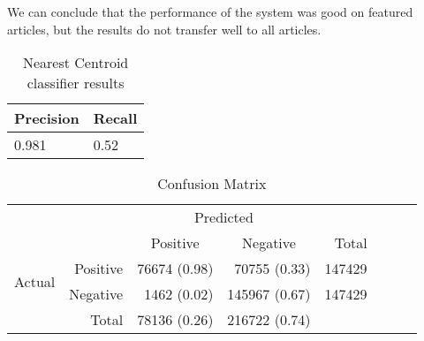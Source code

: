 We can conclude that the performance of the system was good on featured articles, but the results do not transfer well to all articles.

\begin{table}[htbp]
\centering
\begin{tabular}{@{}ll@{}}
\toprule
Precision     & Recall       \\ \midrule
\num{0.981} & \num{0.52} \\
\bottomrule
\end{tabular}
\caption[Nearest Centroid classifier results]{Nearest Centroid classifier results}\label{eval-results}
\end{table}

\begin{table}[htbp]
    \centering
     \begin{tabular}{rrrrrrrr}
      \toprule
      \multicolumn{2}{c}{} & \multicolumn{2}{c}{Predicted} & \\
      \cmidrule{3-4}
      \multicolumn{2}{c}{} & \multicolumn{1}{c}{Positive} & \multicolumn{1}{c}{Negative} & Total \\
      \midrule
      \multirow{2}{*}{Actual} & Positive & \num{76674} (\num{0.98}) & \num{70755} (0.33)  & \num{147429} \\
                              & Negative & \num{1462} (0.02)  & \num{145967} (0.67) & \num{147429} \\
                              \cmidrule{1-2}
                              & Total    & \num{78136} (0.26) & \num{216722} (0.74) \\
      \bottomrule
    \end{tabular}
    \caption[Confusion Matrix]{Confusion Matrix}%
    \label{tab:confusionmatrix}
\end{table}

